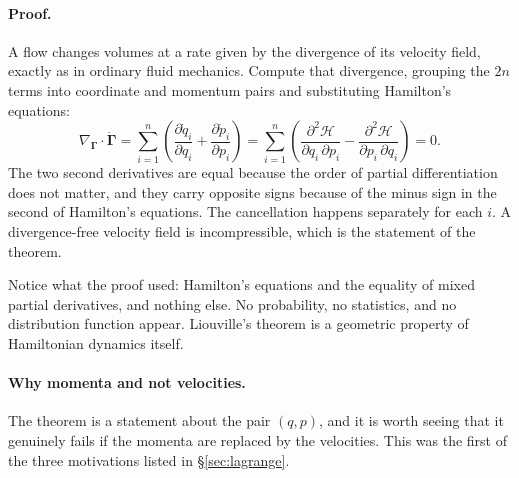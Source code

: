 \documentclass[12pt]{article}
\renewcommand{\vec}[1]{\bm{#1}}
\newcommand{\Ham}{\mathcal{H}}
\begin{document}
\paragraph{Proof.}  A flow changes volumes at a rate given by the
divergence of its velocity field, exactly as in ordinary fluid
mechanics.  Compute that divergence, grouping the $2n$ terms into
coordinate and momentum pairs and substituting Hamilton's equations:
%
\begin{equation}
  \nabla_{\!\vec\Gamma}\!\cdot\!\dot{\vec\Gamma}
   = \sum_{i=1}^{n}\left(
       \frac{\partial\dot q_i}{\partial q_i}
     + \frac{\partial\dot p_i}{\partial p_i}\right)
   = \sum_{i=1}^{n}\left(
       \frac{\partial^2\Ham}{\partial q_i\,\partial p_i}
     - \frac{\partial^2\Ham}{\partial p_i\,\partial q_i}\right)
   = 0 .
  \label{eq:liouville_theorem}
\end{equation}
%
The two second derivatives are equal because the order of partial
differentiation does not matter, and they carry opposite signs because
of the minus sign in the second of Hamilton's equations.  The
cancellation happens separately for each $i$.  A divergence-free
velocity field is incompressible, which is the statement of the
theorem.

Notice what the proof used: Hamilton's equations and the equality of
mixed partial derivatives, and nothing else.  No probability, no
statistics, and no distribution function appear.  Liouville's theorem
is a geometric property of Hamiltonian dynamics itself.

\paragraph{Why momenta and not velocities.}  The theorem is a statement
about the pair $(q,p)$, and it is worth seeing that it genuinely fails
if the momenta are replaced by the velocities.  This was the first of
the three motivations listed in \S\ref{sec:lagrange}.
\end{document}
